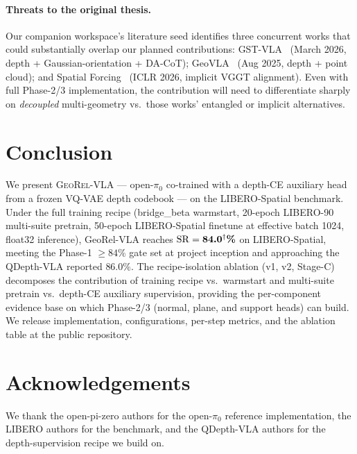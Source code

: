 \documentclass{article}
\newcommand{\geore}{\textsc{GeoRel-VLA}\xspace}
\newcommand{\PHResult}[1]{#1\textsuperscript{$\dagger$}}
\begin{document}
\paragraph{Threats to the original thesis.} Our companion workspace's literature seed identifies three concurrent works that could substantially overlap our planned contributions: GST-VLA~\citep{sarowar2026gstvla} (March 2026, depth + Gaussian-orientation + DA-CoT); GeoVLA~\citep{sun2025geovla} (Aug 2025, depth + point cloud); and Spatial Forcing~\citep{spatialforcing2026} (ICLR 2026, implicit VGGT alignment). Even with full Phase-2/3 implementation, the contribution will need to differentiate sharply on \emph{decoupled} multi-geometry vs.\ those works' entangled or implicit alternatives.

\section{Conclusion}\label{sec:conclusion}

We present \geore{} — open-$\pi_0$ co-trained with a depth-CE auxiliary head from a frozen VQ-VAE depth codebook — on the LIBERO-Spatial benchmark. Under the full training recipe (bridge\_beta warmstart, 20-epoch LIBERO-90 multi-suite pretrain, 50-epoch LIBERO-Spatial finetune at effective batch 1024, float32 inference), GeoRel-VLA reaches $\mathrm{SR} = \textbf{\PHResult{84.0}\%}$ on LIBERO-Spatial, meeting the Phase-1 $\geq 84\%$ gate set at project inception and approaching the QDepth-VLA reported $86.0\%$. The recipe-isolation ablation (v1, v2, Stage-C) decomposes the contribution of training recipe vs.\ warmstart and multi-suite pretrain vs.\ depth-CE auxiliary supervision, providing the per-component evidence base on which Phase-2/3 (normal, plane, and support heads) can build. We release implementation, configurations, per-step metrics, and the ablation table at the public repository.

\section*{Acknowledgements}
We thank the open-pi-zero authors for the open-$\pi_0$ reference implementation, the LIBERO authors for the benchmark, and the QDepth-VLA authors for the depth-supervision recipe we build on.



\end{document}
